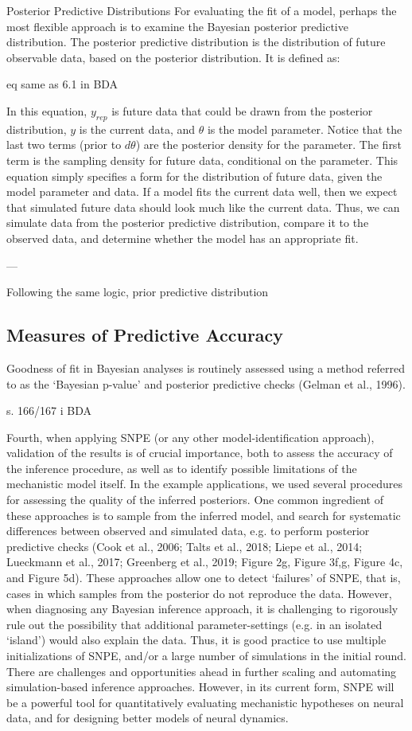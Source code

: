 Posterior Predictive Distributions
For evaluating the fit of a model, perhaps the most flexible approach is to examine the Bayesian posterior predictive distribution. The posterior predictive distribution is the distribution of future observable data, based on the posterior distribution. It is defined as: 

eq same as 6.1 in BDA 

In this equation, $y_{rep}$ is future data that could be drawn from the posterior distribution, $y$ is the current data, and $\theta$ is the model parameter. Notice that the last two terms (prior to $d\theta$) are the posterior density for the parameter. The first term is the sampling density for future data, conditional on the parameter. This equation simply specifies a form for the distribution of future data, given the model parameter and data. If a model fits the current data well, then we expect that simulated future data should look much like the current data. Thus, we can simulate data from the posterior predictive distribution, compare it to the observed data, and determine whether the model has an appropriate fit. 

---

Following the same logic, prior predictive distribution  


\subsection{Measures of Predictive Accuracy}

Goodness of fit in Bayesian analyses is routinely assessed using a method referred to as the ‘Bayesian p-value’ and posterior predictive checks (Gelman et al., 1996).

s. 166/167 i BDA 


Fourth, when applying SNPE (or any other model-identification approach), validation of the results is of crucial importance, both to assess the accuracy of the inference procedure, as well as to identify possible limitations of the mechanistic model itself. In the example applications, we used several procedures for assessing the quality of the inferred posteriors. One common ingredient of these approaches is to sample from the inferred model, and search for systematic differences between observed and simulated data, e.g. to perform posterior predictive checks (Cook et al., 2006; Talts et al., 2018; Liepe et al., 2014; Lueckmann et al., 2017; Greenberg et al., 2019; Figure 2g, Figure 3f,g, Figure 4c, and Figure 5d). These approaches allow one to detect ‘failures’ of SNPE, that is, cases in which samples from the posterior do not reproduce the data. However, when diagnosing any Bayesian inference approach, it is challenging to rigorously rule out the possibility that additional parameter-settings (e.g. in an isolated ‘island’) would also explain the data. Thus, it is good practice to use multiple initializations of SNPE, and/or a large number of simulations in the initial round. There are challenges and opportunities ahead in further scaling and automating simulation-based inference approaches. However, in its current form, SNPE will be a powerful tool for quantitatively evaluating mechanistic hypotheses on neural data, and for designing better models of neural dynamics.

